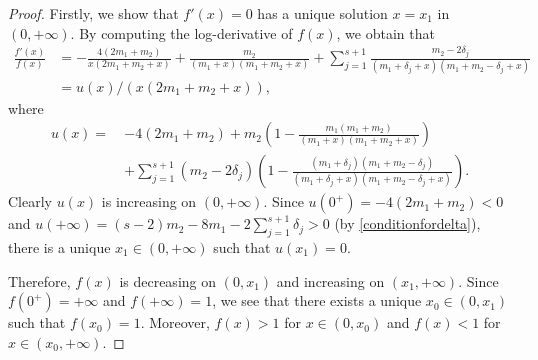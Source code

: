 \documentclass[11pt]{amsart}
\numberwithin{equation}{section}
\begin{document}
\begin{proof}
Firstly, we show that $f'(x) = 0$ has a unique solution $x=x_1$ in $(0,+\infty)$. By computing the log-derivative of $f(x)$, we obtain that
\begin{align*}
\frac{f'(x)}{f(x)} &= -\frac{4(2m_1+m_2)}{x(2m_1+m_2+x)} + \frac{m_2}{(m_1+x)(m_1+m_2+x)} + \sum_{j=1}^{s+1}\frac{m_2-2\delta_j}{(m_1+\delta_j+x)(m_1+m_2-\delta_j+x)} \\
&= u(x)/(x(2m_1+m_2+x)),
\end{align*}
where
\begin{align*}
u(x) = ~&-4(2m_1+m_2)+m_2\left( 1-\frac{m_1(m_1+m_2)}{(m_1+x)(m_1+m_2+x)} \right) \\
&+ \sum_{j=1}^{s+1} (m_2-2\delta_j)\left( 1- \frac{(m_1+\delta_j)(m_1+m_2-\delta_j)}{(m_1+\delta_j+x)(m_1+m_2-\delta_j+x)} \right).
\end{align*}
Clearly $u(x)$ is increasing on $(0,+\infty)$. Since $u(0^{+}) = -4(2m_1+m_2)<0$ and $u(+\infty) = (s-2)m_2-8m_1 -2\sum_{j=1}^{s+1} \delta_j > 0$ (by \eqref{conditionfordelta}), there is a unique $x_1 \in (0,+\infty)$ such that $u(x_1) = 0$.

Therefore, $f(x)$ is decreasing on $(0,x_1)$ and increasing on $(x_1,+\infty)$. Since $f(0^{+}) = +\infty$ and $f(+\infty) = 1$, we see that there exists a unique $x_0 \in (0,x_1)$ such that $f(x_0) = 1$. Moreover, $f(x) > 1$ for $x \in (0,x_0)$ and $f(x)<1$ for $x \in (x_0,+\infty)$.


\end{proof}
\end{document}
